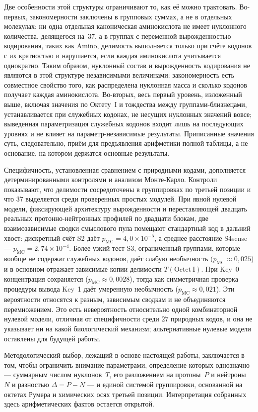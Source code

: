 \documentclass[11pt,a4paper]{article}
\renewcommand{\_}{\origunderscore\allowbreak}
\begin{document}
Две особенности этой структуры ограничивают то, как
её можно трактовать. Во-первых, закономерности
заключены в групповых суммах, а не в отдельных
молекулах: ни одна отдельная каноническая
аминокислота не имеет нуклонного количества,
делящегося на~$37$, а в группах с переменной
вырожденностью кодирования, таких как
$\mathrm{Amino}$, делимость выполняется только при
счёте кодонов с их кратностью и нарушается, если
каждая аминокислота учитывается однократно. Таким
образом, нуклонный состав и вырожденность
кодирования не являются в этой структуре
независимыми величинами: закономерность есть
совместное свойство того, как распределена нуклонная
масса и сколько кодонов получает каждая
аминокислота. Во-вторых, весь первый уровень,
изложенный выше, включая значения по
Октету~I и тождества между
группами-близнецами, устанавливается при служебных
кодонах, не несущих нуклонных значений вовсе;
выведенная параметризация служебных кодонов входит
лишь на последующих уровнях и не влияет на
параметр-независимые результаты. Приписанные значения
суть, следовательно, приём для предъявления
арифметики полной таблицы, а не основание, на котором
держатся основные результаты.

Специфичность, установленная сравнением с природными
кодами, дополняется детерминированными контролями и
анализом Монте-Карло. Контроли показывают, что делимости
сосредоточены в группировках по третьей позиции и что
$37$ выделяется среди проверенных простых модулей.
При явной нулевой модели, фиксирующей архитектуру вырожденности
и переставляющей двадцать реальных протонно-нейтронных профилей
по двадцати блокам, две взаимозависимые сводки смыслового пула
помещают стандартный код в дальний хвост: дискретный счёт S2 даёт
$p_{\mathrm{MC}} = 4{,}0 \times 10^{-5}$, а среднее расстояние
S4sense --- $p_{\mathrm{MC}} = 2{,}74 \times 10^{-4}$. Более узкий
тест S3, ограниченный группами, которые вообще не содержат
служебных кодонов, даёт слабую необычность
($p_{\mathrm{MC}} \approx 0{,}025$) и в основном отражает зависимые
копии делимости $T(\mathrm{Octet~I})$. При Key~0 концентрация
сохраняется ($p_{\mathrm{MC}} \approx 0{,}0028$), тогда как
симметричная проверка процедуры вывода Key~1 даёт умеренную
необычность ($p_{\mathrm{MC}} \approx 0{,}021$). Эти вероятности
относятся к разным, зависимым сводкам и не объединяются
перемножением.
Это есть невероятность относительно одной комбинаторной
нулевой модели, отличная от специфичности среди $27$
природных кодов, и она не указывает ни на какой
биологический механизм; альтернативные нулевые модели
оставлены для будущей работы.

Методологический выбор, лежащий в основе настоящей работы,
заключается в том, чтобы ограничить внимание параметрами,
определение которых однозначно — суммарным числом
нуклонов~$T$, его разложением на протоны~$P$ и
нейтроны~$N$ и разностью $\Delta = P - N$ —
и единой системой группировки, основанной на октетах
Румера и химических осях третьей позиции.
Интерпретация собранных здесь арифметических фактов
остается открытой.


\end{document}
